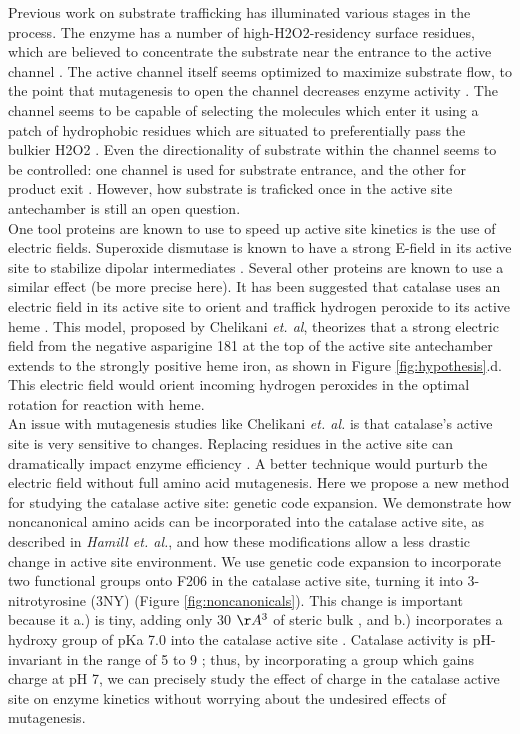 \documentclass[9pt,twocolumn,twoside]{pnas-new}
\begin{document}
Previous work on substrate trafficking has illuminated various stages in the process. The enzyme has a number of high-H2O2-residency surface residues, which are believed to concentrate the substrate near the entrance to the active channel \cite{concentrateh2o2}. The active channel itself seems optimized to maximize substrate flow, to the point that mutagenesis to open the channel decreases enzyme activity \cite{substrateflow}. The channel seems to be capable of selecting the molecules which enter it using a patch of hydrophobic residues which are situated to preferentially pass the bulkier H2O2 \cite{molecularruler}. Even the directionality of substrate within the channel seems to be controlled: one channel is used for substrate entrance, and the other for product exit \cite{lateralchannel}. However, how substrate is traficked once in the active site antechamber is still an open question.\\

One tool proteins are known to use to speed up active site kinetics is the use of electric fields. Superoxide dismutase is known to have a strong E-field in its active site to stabilize dipolar intermediates \cite{conserved-as-efield-sod, concentrated-as-efield-sod}. Several other proteins are known to use a similar effect \cite{efield-review} (be more precise here). It has been suggested that catalase uses an electric field in its active site to orient and traffick hydrogen peroxide to its active heme \cite{electricpotential}. This model, proposed by Chelikani \textit{et. al}, theorizes that a strong electric field from the negative asparigine 181 at the top of the active site antechamber extends to the strongly positive heme iron, as shown in Figure \ref{fig:hypothesis}.d. This electric field would orient incoming hydrogen peroxides in the optimal rotation for reaction with heme.\\

An issue with mutagenesis studies like Chelikani \textit{et. al.} is that catalase's active site is very sensitive to changes. Replacing residues in the active site can dramatically impact enzyme efficiency \cite{substrateflow}. A better technique would purturb the electric field without full amino acid mutagenesis. Here we propose a new method for studying the catalase active site: genetic code expansion. We demonstrate how noncanonical amino acids can be incorporated into the catalase active site, as described in \textit{Hamill et. al.}, and how these modifications allow a less drastic change in active site environment. We use genetic code expansion \cite{hammill} to incorporate two functional groups onto F206 in the catalase active site, turning it into 3-nitrotyrosine (3NY) (Figure \ref{fig:noncanonicals}). This change is important because it a.) is tiny, adding only 30 $\AA^3$ of steric bulk \cite{3ntsize}, and b.) incorporates a hydroxy group of pKa 7.0 into the catalase active site \cite{3ntsize}. Catalase activity is pH-invariant in the range of 5 to 9 \cite{phdependence,kcatkm}; thus, by incorporating a group which gains charge at pH 7, we can precisely study the effect of charge in the catalase active site on enzyme kinetics without worrying about the undesired effects of mutagenesis.\\
\end{document}
